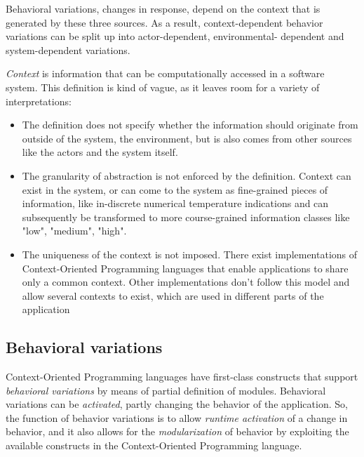 \documentclass{acm_proc_article-sp}
\begin{document}
Behavioral variations, changes in response, depend on the context that is generated by these three sources. As a result, context-dependent behavior variations can be split up into actor-dependent, environmental- dependent and  system-\linebreak dependent variations.

\textit{Context} is information that can be computationally accessed in a software system. This definition is kind of vague, as it leaves room for a variety of interpretations:

\begin{itemize}
\item The definition does not specify whether the information should originate from outside of the system, the environment, but is also comes from other sources like the actors and the system itself.
\item The granularity of abstraction is not enforced by the definition. Context can exist in the system, or can come to the system as fine-grained pieces of information, like in-discrete numerical temperature indications and can subsequently be transformed to more course-grained information classes like "low", "medium", "high". 
\item The uniqueness of the context is not imposed. There exist implementations of Context-Oriented Programming languages that enable applications to share only a common context. Other implementations don't follow this model and allow several contexts to exist, which are used in different parts of the application \cite{Appeltauer:2009:CCP:1562112.1562118}
\end{itemize}

\subsection{Behavioral variations}
\label{sec:behavioral_variations}
Context-Oriented Programming languages have first-class constructs that support \textit{behavioral variations} by means of partial definition of modules. Behavioral variations can be \textit{activated}, partly changing the behavior of the application. So, the function of behavior variations is to allow \textit{runtime activation} of a change in behavior, and it also allows for the \textit{modularization} of behavior by exploiting the available constructs in the Context-Oriented Programming language.    
\end{document}
